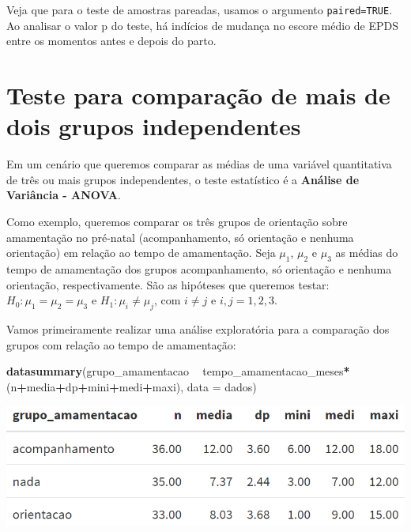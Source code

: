 \documentclass[
]{book}
\newenvironment{Shaded}{\begin{snugshade}}{\end{snugshade}}
\newcommand{\DataTypeTok}[1]{\textcolor[rgb]{0.13,0.29,0.53}{#1}}
\newcommand{\KeywordTok}[1]{\textcolor[rgb]{0.13,0.29,0.53}{\textbf{#1}}}
\newcommand{\NormalTok}[1]{#1}
\newcommand{\OperatorTok}[1]{\textcolor[rgb]{0.81,0.36,0.00}{\textbf{#1}}}
\newcommand{\StringTok}[1]{\textcolor[rgb]{0.31,0.60,0.02}{#1}}
\begin{document}
Veja que para o teste de amostras pareadas, usamos o argumento \texttt{paired=TRUE}.
Ao analisar o valor p do teste, há indícios de mudança no escore médio de EPDS entre os momentos antes e depois do parto.

\hypertarget{teste-para-comparauxe7uxe3o-de-mais-de-dois-grupos-independentes}{%
\section{Teste para comparação de mais de dois grupos independentes}\label{teste-para-comparauxe7uxe3o-de-mais-de-dois-grupos-independentes}}

Em um cenário que queremos comparar as médias de uma variável quantitativa de três ou mais grupos independentes, o teste estatístico é a \textbf{Análise de Variância - ANOVA}.

Como exemplo, queremos comparar os três grupos de orientação sobre amamentação no pré-natal (acompanhamento, só orientação e nenhuma orientação) em relação ao tempo de amamentação. Seja \(\mu_1\), \(\mu_2\) e \(\mu_3\) as médias do tempo de amamentação dos grupos acompanhamento, só orientação e nenhuma orientação, respectivamente. São as hipóteses que queremos testar: \(H_0:\mu_1=\mu_2=\mu_3\) e \(H_1: \mu_i\neq \mu_j\), com \(i\neq j\) e \(i,j=1,2,3\).

Vamos primeiramente realizar uma análise exploratória para a comparação dos grupos com relação ao tempo de amamentação:

\begin{Shaded}
\begin{Highlighting}[]
\KeywordTok{datasummary}\NormalTok{(grupo_amamentacao }\OperatorTok{~}\StringTok{ }\NormalTok{tempo_amamentacao_meses}\OperatorTok{*}\NormalTok{(n}\OperatorTok{+}\NormalTok{media}\OperatorTok{+}\NormalTok{dp}\OperatorTok{+}\NormalTok{mini}\OperatorTok{+}\NormalTok{medi}\OperatorTok{+}\NormalTok{maxi), }\DataTypeTok{data =}\NormalTok{ dados)}
\end{Highlighting}
\end{Shaded}

\includegraphics[width=1\linewidth]{figures/descritivas_amament}
\end{document}
